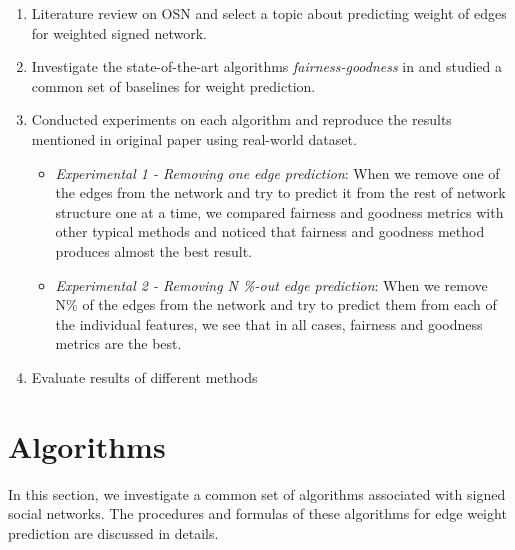 \documentclass{article}
\begin{document}
\begin{enumerate}
	\item Literature review on OSN and select a topic about predicting weight of edges for weighted signed network.
	
	\item Investigate the state-of-the-art algorithms \emph{fairness-goodness} in\cite{kumar2016edge} and  studied a common set of baselines for weight prediction.
	
	\item Conducted experiments on each algorithm and reproduce the results mentioned in original paper using real-world dataset.
  
  \begin{itemize}
    \item \emph{Experimental 1 -   Removing one edge prediction}: 
    When we remove one of the edges from the network and try to 
    predict it from the rest of network structure one at a time, 
    we compared fairness and goodness metrics with other typical 
    methods and noticed that fairness and goodness method produces 
    almost the best result. 
	
    \item \emph{Experimental 2 -  Removing N \%-out edge prediction}: 
    When we remove N\% of the edges from the network and try to 
    predict them from each of the individual features, we see 
    that in all cases, fairness and goodness metrics are the best.
  \end{itemize}
  
  \item  Evaluate results of different methods
	
\end{enumerate}

\section{Algorithms}

In this section, we investigate a common set of algorithms
associated with signed social networks. The procedures and
formulas of these algorithms for edge weight prediction are 
discussed in details. 








\end{document}
